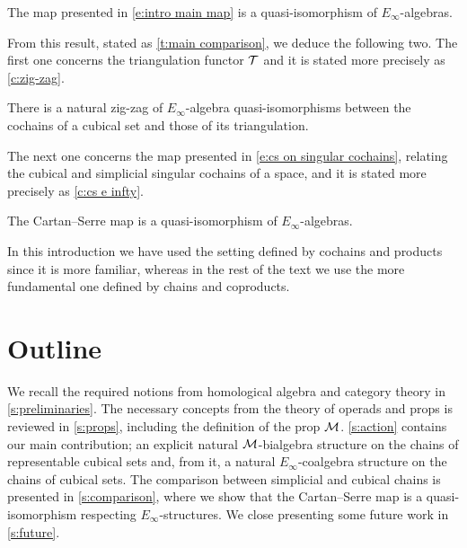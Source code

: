 \begin{theorem*}
	The map presented in \cref{e:intro main map} is a quasi-isomorphism of $E_\infty$-algebras.
\end{theorem*}

From this result, stated as \cref{t:main comparison}, we deduce the following two.
The first one concerns the triangulation functor $\operatorname{\mathcal{T}}$ and it is stated more precisely as \cref{c:zig-zag}.

\begin{corollary*}
	There is a natural zig-zag of $E_\infty$-algebra quasi-isomorphisms between the cochains of a cubical set and those of its triangulation.
\end{corollary*}

The next one concerns the map presented in \cref{e:cs on singular cochains}, relating the cubical and simplicial singular cochains of a space, and it is stated more precisely as \cref{c:cs e infty}.

\begin{corollary*}
	The Cartan--Serre map is a quasi-isomorphism of $E_\infty$-algebras.
\end{corollary*}

\begin{remark*}
	In this introduction we have used the setting defined by cochains and products since it is more familiar, whereas in the rest of the text we use the more fundamental one defined by chains and coproducts.
\end{remark*}

\section*{Outline}

We recall the required notions from homological algebra and category theory in \cref{s:preliminaries}.
The necessary concepts from the theory of operads and props is reviewed in \cref{s:props}, including the definition of the prop $\mathcal{M}$.
\cref{s:action} contains our main contribution; an explicit natural $\mathcal{M}$-bialgebra structure on the chains of representable cubical sets and, from it, a natural $E_\infty$-coalgebra structure on the chains of cubical sets.
The comparison between simplicial and cubical chains is presented in \cref{s:comparison}, where we show that the Cartan--Serre map is a quasi-isomorphism respecting $E_\infty$-structures.
We close presenting some future work in \cref{s:future}.